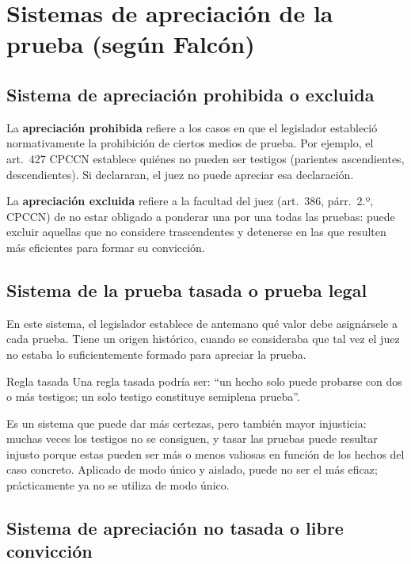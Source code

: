 \documentclass[12pt,oneside]{book}
\begin{document}
\section{Sistemas de apreciación de la prueba (según Falcón)}

\subsection{Sistema de apreciación prohibida o excluida}

La \textbf{apreciación prohibida} refiere a los casos en que el legislador estableció normativamente la prohibición de ciertos medios de prueba. Por ejemplo, el art.~427 CPCCN establece quiénes no pueden ser testigos (parientes ascendientes, descendientes). Si declararan, el juez no puede apreciar esa declaración.

La \textbf{apreciación excluida} refiere a la facultad del juez (art.~386, párr.~2.º, CPCCN) de no estar obligado a ponderar una por una todas las pruebas: puede excluir aquellas que no considere trascendentes y detenerse en las que resulten más eficientes para formar su convicción.

\subsection{Sistema de la prueba tasada o prueba legal}

En este sistema, el legislador establece de antemano qué valor debe asignársele a cada prueba. Tiene un origen histórico, cuando se consideraba que tal vez el juez no estaba lo suficientemente formado para apreciar la prueba.

\begin{example}{Regla tasada}
Una regla tasada podría ser: ``un hecho solo puede probarse con dos o más testigos; un solo testigo constituye semiplena prueba''.
\end{example}

Es un sistema que puede dar más certezas, pero también mayor injusticia: muchas veces los testigos no se consiguen, y tasar las pruebas puede resultar injusto porque estas pueden ser más o menos valiosas en función de los hechos del caso concreto. Aplicado de modo único y aislado, puede no ser el más eficaz; prácticamente ya no se utiliza de modo único.

\subsection{Sistema de apreciación no tasada o libre convicción}
\end{document}
